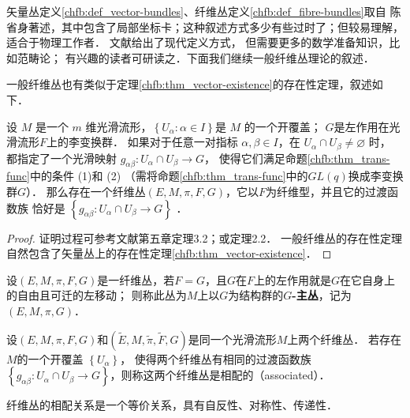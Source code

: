 矢量丛定义\ref{chfb:def_vector-bundles}、纤维丛定义\ref{chfb:def_fibre-bundles}取自
陈省身著述，其中包含了局部坐标卡；这种叙述方式多少有些过时了；但较易理解，适合于物理工作者．
文献\parencite{Husemoller-1994}给出了现代定义方式，%
但需要更多的数学准备知识，比如范畴论；
有兴趣的读者可研读之．下面我们继续一般纤维丛理论的叙述．

一般纤维丛也有类似于定理\ref{chfb:thm_vector-existence}的存在性定理，叙述如下．

\begin{theorem}\label{chfb:thm_fb-existence}
    设 $M$ 是一个 $m$ 维光滑流形，$\left\{U_\alpha: \alpha \in I\right\}$是 $M$ 的一个开覆盖；
    $G$是左作用在光滑流形$F$上的李变换群．
    如果对于任意一对指标 $\alpha, \beta \in I$，在 $U_\alpha \cap U_\beta \neq \varnothing$ 时，
    都指定了一个光滑映射 $g_{\alpha \beta}: U_\alpha \cap U_\beta \rightarrow G$，
    使得它们满足命题\ref{chfb:thm_trans-func}中的条件 (1)和 (2)
    （需将命题\ref{chfb:thm_trans-func}中的$GL(q)$换成李变换群$G$）．
    那么存在一个纤维丛$(E,M,\pi,F,G)$，它以$F$为纤维型，并且它的过渡函数族
    恰好是 $\left\{g_{\alpha \beta}: U_\alpha \cap U_\beta \rightarrow G\right\}$ ．
\end{theorem}

\begin{proof}
    证明过程可参考文献\parencite{Husemoller-1994}第五章定理3.2；或\parencite[\S 10.2]{chen-li-2004v2}定理2.2．
    一般纤维丛的存在性定理自然包含了矢量丛上的存在性定理\ref{chfb:thm_vector-existence}．
\end{proof}




\begin{definition}
    设$(E, M, \pi, F, G)$是一纤维丛，若$F=G$，且$G$在$F$上的左作用就是$G$在它自身上的{\kaishu 自由且可迁}的左移动；
    则称此丛为$M$上以$G$为结构群的{\heiti \bfseries $G$-主丛}，记为 $(E, M, \pi, G)$．
\end{definition} 

\begin{definition}\label{chfb:def_associated}
    设$(E, M, \pi, F, G)$和$(\widetilde{E}, M, \tilde{\pi}, \widetilde{F}, G)$是同一个光滑流形$M$上两个纤维丛．
    若存在$M$的一个开覆盖 $\left\{U_\alpha\right\}$，
    使得两个纤维丛有相同的过渡函数族$\left\{g_{\alpha \beta}:
    U_\alpha \cap U_\beta \rightarrow G\right\}$，则称这两个纤维丛是{\heiti 相配的}（associated）．
\end{definition} 

纤维丛的相配关系是一个等价关系，具有自反性、对称性、传递性．


